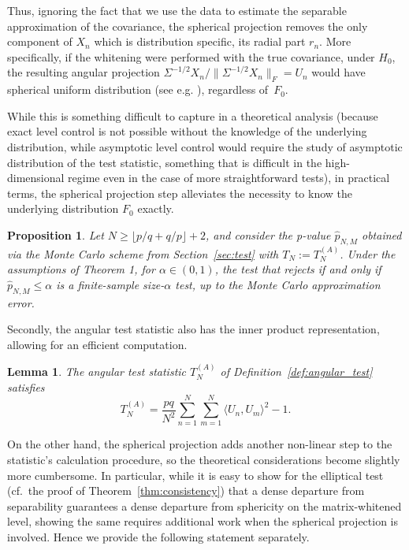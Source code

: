 \documentclass[12pt]{article}
\newtheorem{proposition}{Proposition}
\newtheorem{lemma}{Lemma}
\begin{document}
Thus, ignoring the fact that we use the data to estimate the separable approximation of the covariance, the spherical projection removes the only component of $X_n$ which is distribution specific, its radial part $r_n$. More specifically, if the whitening were performed with the true covariance, under $H_0$, the resulting angular projection $\Sigma^{-1/2} X_n/\|\Sigma^{-1/2} X_n\|_F=U_n$ would have spherical uniform distribution (see e.g. \cite{DURRE201680}), regardless of~$F_0$. 

While this is something difficult to capture in a theoretical analysis (because exact level control is not possible without the knowledge of the underlying distribution, while asymptotic level control would require the study of asymptotic distribution of the test statistic, something that is difficult in the high-dimensional regime even in the case of more straightforward tests), in practical terms, the spherical projection step alleviates the necessity to know the underlying distribution $F_0$ exactly.


\begin{proposition}\label{prop:angular_level}
    Let $N \geq \lfloor p/q+q/p \rfloor  + 2$, and consider the p-value $\widehat{p}_{N,M}$ obtained via the Monte Carlo scheme from Section~\ref{sec:test} with $T_N := T_N^{(A)}$. Under the assumptions of Theorem 1, for $\alpha \in (0,1)$, the test that rejects if and only if $\widehat{p}_{N,M} \leq \alpha$ is a finite-sample size-$\alpha$ test, up to the Monte Carlo approximation error.
\end{proposition}

Secondly, the angular test statistic also has the inner product representation, allowing for an efficient computation.

\begin{lemma}\label{lem:angular_computation}
    The angular test statistic $T_{N}^{(A)}$ of Definition~\ref{def:angular_test} satisfies
        \[
        T_N^{(A)} = \frac{pq}{N^2} \sum_{n=1}^N\sum_{m=1}^N \langle U_n, U_m\rangle^2 -1.
        \]
\end{lemma}

On the other hand, the spherical projection adds another non-linear step to the statistic's calculation procedure, so the theoretical considerations become slightly more cumbersome. In particular, while it is easy to show for the elliptical test (cf.~the proof of Theorem~\ref{thm:consistency}) that a dense departure from separability guarantees a dense departure from sphericity on the matrix-whitened level, showing the same requires additional work when the spherical projection is involved. Hence we provide the following statement separately.
\end{document}
